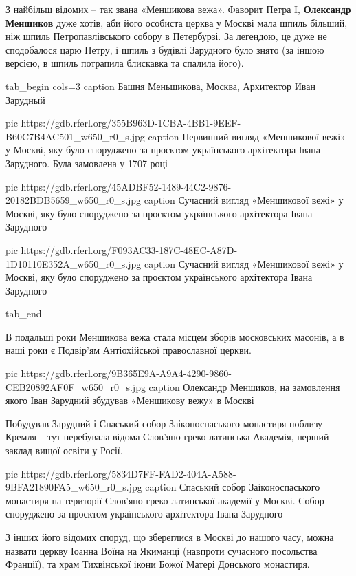 З найбільш відомих – так звана «Меншикова вежа». Фаворит Петра I, \textbf{Олександр
Меншиков} дуже хотів, аби його особиста церква у Москві мала шпиль більший, ніж
шпиль Петропавлівського собору в Петербурзі. За легендою, це дуже не
сподобалося царю Петру, і шпиль з будівлі Зарудного було знято (за іншою
версією, в шпиль потрапила блискавка та спалила його).

\ifcmt
tab_begin cols=3
	caption Башня Меньшикова, Москва, Архитектор Иван Зарудный

pic https://gdb.rferl.org/355B963D-1CBA-4BB1-9EEF-B60C7B4AC501_w650_r0_s.jpg
caption Первинний вигляд «Меншикової вежі» у Москві, яку було споруджено за проєктом українського архітектора Івана Зарудного. Була замовлена у 1707 році

pic https://gdb.rferl.org/45ADBF52-1489-44C2-9876-20182BDB5659_w650_r0_s.jpg
caption Сучасний вигляд «Меншикової вежі» у Москві, яку було споруджено за проєктом українського архітектора Івана Зарудного

pic https://gdb.rferl.org/F093AC33-187C-48EC-A87D-1D10110E352A_w650_r0_s.jpg
caption Сучасний вигляд «Меншикової вежі» у Москві, яку було споруджено за проєктом українського архітектора Івана Зарудного

tab_end
\fi

В подальші роки Меншикова вежа стала місцем зборів московських масонів, а в
наші роки є Подвір’ям Антіохійської православної церкви.


\ifcmt
pic https://gdb.rferl.org/9B365E9A-A9A4-4290-9860-CEB20892AF0F_w650_r0_s.jpg
caption Олександр Меншиков, на замовлення якого Іван Зарудний збудував «Меншикову вежу» в Москві
\fi

Побудував Зарудний і Спаський собор Заіконоспаського монастиря поблизу Кремля –
тут перебувала відома Слов’яно-греко-латинська Академія, перший заклад вищої
освіти у Росії.

\ifcmt
pic https://gdb.rferl.org/5834D7FF-FAD2-404A-A588-9BFA21890FA5_w650_r0_s.jpg
caption Спаський собор Заіконоспаського монастиря на території Слов’яно-греко-латинської академії у Москві. Собор споруджено за проєктом українського архітектора Івана Зарудного
\fi

З інших його відомих споруд, що збереглися в Москві до нашого часу, можна
назвати церкву Іоанна Воїна на Якиманці (навпроти сучасного посольства
Франції), та храм Тихвінської ікони Божої Матері Донського монастиря.

